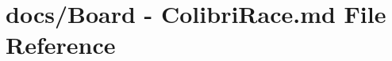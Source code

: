 \hypertarget{Board_01-_01ColibriRace_8md}{\section{docs/\+Board -\/ Colibri\+Race.\+md File Reference}
\label{Board_01-_01ColibriRace_8md}
}
